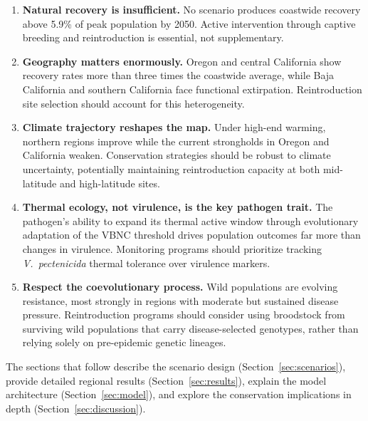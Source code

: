 \begin{enumerate}
    \item \textbf{Natural recovery is insufficient.} No scenario produces
    coastwide recovery above 5.9\% of peak population by 2050. Active
    intervention through captive breeding and reintroduction
    \citep{hodin2021} is essential, not supplementary.

    \item \textbf{Geography matters enormously.} Oregon and central
    California show recovery rates more than three times the coastwide
    average, while Baja California and southern California face functional
    extirpation. Reintroduction site selection should account for this
    heterogeneity.

    \item \textbf{Climate trajectory reshapes the map.} Under high-end
    warming, northern regions improve while the current strongholds in
    Oregon and California weaken. Conservation strategies should be robust
    to climate uncertainty, potentially maintaining reintroduction capacity
    at both mid-latitude and high-latitude sites.

    \item \textbf{Thermal ecology, not virulence, is the key pathogen
    trait.} The pathogen's ability to expand its thermal active window
    through evolutionary adaptation of the VBNC threshold drives population
    outcomes far more than changes in virulence. Monitoring programs should
    prioritize tracking \textit{V.\ pectenicida} thermal tolerance over
    virulence markers.

    \item \textbf{Respect the coevolutionary process.} Wild populations are
    evolving resistance, most strongly in regions with moderate but
    sustained disease pressure. Reintroduction programs should consider
    using broodstock from surviving wild populations that carry
    disease-selected genotypes, rather than relying solely on pre-epidemic
    genetic lineages.
\end{enumerate}

The sections that follow describe the scenario design (Section~\ref{sec:scenarios}), provide detailed regional results (Section~\ref{sec:results}), explain the model architecture (Section~\ref{sec:model}), and explore the conservation implications in depth (Section~\ref{sec:discussion}).
